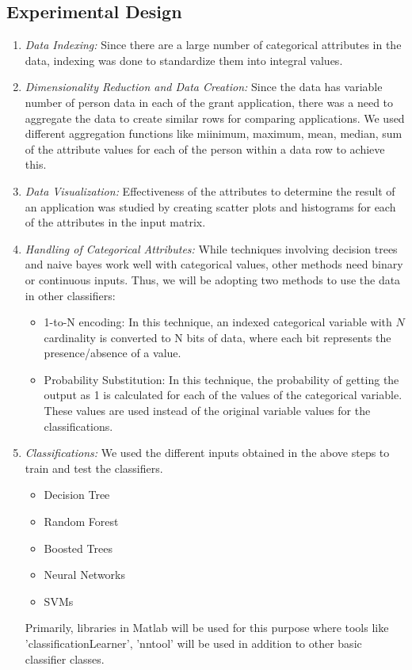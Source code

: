 \documentclass{article} %
\begin{document}
\subsection{Experimental Design}
\begin{enumerate}
	\item \emph{Data Indexing:} Since there are a large number of categorical attributes in the data, indexing was done to standardize them into integral values.
	\item \emph{Dimensionality Reduction and Data Creation:} Since the data has variable number of person data in each of the grant application, there was a need to aggregate the data to create similar rows for comparing applications. We used different aggregation functions like miinimum, maximum, mean, median, sum of the attribute values for each of the person within a data row\cite{OneRow} to achieve this.
	\item \emph{Data Visualization:} Effectiveness of the attributes to determine the result of an application was studied by creating scatter plots and histograms for each of the attributes in the input matrix. 
	\item \emph{Handling of Categorical Attributes:} While techniques involving decision trees and naive bayes work well with categorical values, other methods need binary or continuous inputs. Thus, we will be adopting two methods to use the data in other classifiers:
	 
	\begin{itemize}
		\item 1-to-N encoding: In this technique, an indexed categorical variable with $N$ cardinality is converted to N bits of data, where each bit represents the presence/absence of a value. 
		\item Probability Substitution: In this technique, the probability of getting the output as 1 is calculated for each of the values of the categorical variable. These values are used instead of the original variable values for the classifications.  \cite{HighCard}
	\end{itemize}  
	
	
	\item \emph{Classifications:} We used the different inputs obtained in the above steps to train and test the classifiers.
	\begin{itemize}
		\item Decision Tree
		\item Random Forest
		\item Boosted Trees
		\item Neural Networks
		\item SVMs
	\end{itemize}
	 Primarily, libraries in Matlab will be used for this purpose where tools like 'classificationLearner', 'nntool' will be used in addition to other basic classifier classes.
	 

\end{enumerate}
\end{document}
